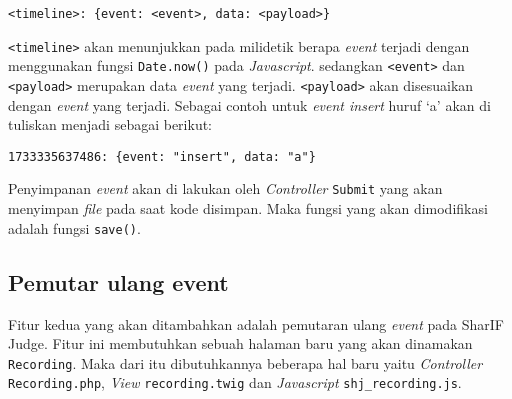 \begin{center}
      \verb|<timeline>: {event: <event>, data: <payload>}|
\end{center}

\verb|<timeline>| akan menunjukkan pada milidetik berapa \textit{event} terjadi dengan menggunakan fungsi \verb|Date.now()| pada \textit{Javascript}. sedangkan \verb|<event>| dan \verb|<payload>| merupakan data \textit{event} yang terjadi. \verb|<payload>| akan disesuaikan dengan \textit{event} yang terjadi. Sebagai contoh untuk \textit{event insert} huruf `a' akan di tuliskan menjadi sebagai berikut:

\begin{center}
      \verb|1733335637486: {event: "insert", data: "a"}|
\end{center}

Penyimpanan \textit{event} akan di lakukan oleh \textit{Controller} \verb|Submit| yang akan menyimpan \textit{file} pada saat kode disimpan. Maka fungsi yang akan dimodifikasi adalah fungsi \verb|save()|.

\begin{comment}
Rekam 3 event aja:
- Mouseup dari editor
- beforeEndOperation dari selection
- afterExec dari commands

Penjelasan
- Mouseup + beforeEndOperation (ini ngeliat cursor movement + selection movement). [yang ini buat mouse].
- afterExec: Semua operation yang akan dilakukan di keyboard (kaya "insert", "copy", "paste"), tapi kaya right-click mouse terus paste jg bisa.

Rekam juga input + output yang dimasukkin tapi ga sampe cursor

Simpen di tempat yg sama kaya penyimpanan kode, mungkin di pisah per submission juga. simpen kaya json aja biar gampang dibaca?. simpen timestart, event: [time: {action: ?, payload: ?}].
\end{comment}

\subsection{Pemutar ulang event}
\label{sub:3:2:pemutarulang}

Fitur kedua yang akan ditambahkan adalah pemutaran ulang \textit{event} pada SharIF Judge. Fitur ini membutuhkan sebuah halaman baru yang akan dinamakan \verb|Recording|. Maka dari itu dibutuhkannya beberapa hal baru yaitu \textit{Controller} \verb|Recording.php|, \textit{View} \verb|recording.twig| dan \textit{Javascript} \verb|shj_recording.js|.


